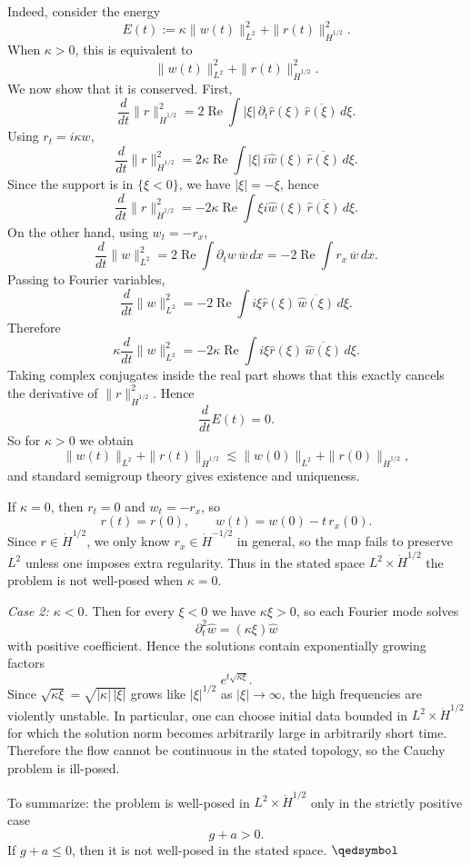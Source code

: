 \documentclass[lang=en,11pt,a4paper,citestyle=authoryear]{elegantpaper}
\newcommand{\prvd}{$\hfill \qedsymbol$}
\newcommand{\Ree}{\operatorname{Re}}
\newcommand{\1}{\mathbbm{1}}
\newcommand{\ov}{\overline}
\begin{document}
Indeed, consider the energy
\[
E(t):=\kappa\|w(t)\|_{L^2}^2+\|r(t)\|_{\dot H^{1/2}}^2.
\]
When $\kappa>0$, this is equivalent to
\[
\|w(t)\|_{L^2}^2+\|r(t)\|_{\dot H^{1/2}}^2.
\]
We now show that it is conserved. First,
\[
\frac{d}{dt}\|r\|_{\dot H^{1/2}}^2
=2\Ree\int |\xi|\,\partial_t\widehat r(\xi)\,\ov{\widehat r(\xi)}\,d\xi.
\]
Using $r_t=i\kappa w$,
\[
\frac{d}{dt}\|r\|_{\dot H^{1/2}}^2
=2\kappa\Ree\int |\xi|\,i\widehat w(\xi)\,\ov{\widehat r(\xi)}\,d\xi.
\]
Since the support is in $\{\xi<0\}$, we have $|\xi|=-\xi$, hence
\[
\frac{d}{dt}\|r\|_{\dot H^{1/2}}^2
=-2\kappa\Ree\int \xi i\widehat w(\xi)\,\ov{\widehat r(\xi)}\,d\xi.
\]
On the other hand, using $w_t=-r_x$,
\[
\frac{d}{dt}\|w\|_{L^2}^2
=2\Ree\int \partial_tw\,\ov w\,dx
=-2\Ree\int r_x\,\ov w\,dx.
\]
Passing to Fourier variables,
\[
\frac{d}{dt}\|w\|_{L^2}^2
=-2\Ree\int i\xi\widehat r(\xi)\,\ov{\widehat w(\xi)}\,d\xi.
\]
Therefore
\[
\kappa\frac{d}{dt}\|w\|_{L^2}^2
=-2\kappa\Ree\int i\xi\widehat r(\xi)\,\ov{\widehat w(\xi)}\,d\xi.
\]
Taking complex conjugates inside the real part shows that this exactly cancels the derivative of $\|r\|_{\dot H^{1/2}}^2$. Hence
\[
\frac{d}{dt}E(t)=0.
\]
So for $\kappa>0$ we obtain
\[
\|w(t)\|_{L^2}+\|r(t)\|_{\dot H^{1/2}}
\lesssim
\|w(0)\|_{L^2}+\|r(0)\|_{\dot H^{1/2}},
\]
and standard semigroup theory gives existence and uniqueness.

If $\kappa=0$, then $r_t=0$ and $w_t=-r_x$, so
\[
r(t)=r(0),
\qquad
w(t)=w(0)-t\,r_x(0).
\]
Since $r\in \dot H^{1/2}$, we only know $r_x\in \dot H^{-1/2}$ in general, so the map fails to preserve $L^2$ unless one imposes extra regularity. Thus in the stated space $L^2\times \dot H^{1/2}$ the problem is not well-posed when $\kappa=0$.

\medskip
\emph{Case 2: $\kappa<0$.} Then for every $\xi<0$ we have $\kappa\xi>0$, so each Fourier mode solves
\[
\partial_t^2\widehat w=(\kappa\xi)\widehat w
\]
with positive coefficient. Hence the solutions contain exponentially growing factors
\[
e^{t\sqrt{\kappa\xi}}.
\]
Since $\sqrt{\kappa\xi}=\sqrt{|\kappa|\,|\xi|}$ grows like $|\xi|^{1/2}$ as $|\xi|\to\infty$, the high frequencies are violently unstable. In particular, one can choose initial data bounded in $L^2\times \dot H^{1/2}$ for which the solution norm becomes arbitrarily large in arbitrarily short time. Therefore the flow cannot be continuous in the stated topology, so the Cauchy problem is ill-posed.

To summarize: the problem is well-posed in $L^2\times \dot H^{1/2}$ only in the strictly positive case
\[
g+a>0.
\]
If $g+a\le 0$, then it is not well-posed in the stated space. \prvd
\end{document}
